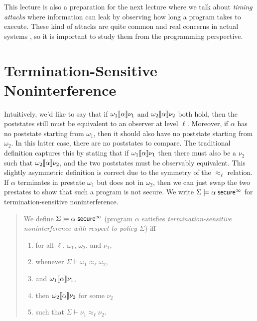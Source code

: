 \documentclass[11pt]{article}
\begin{document}
This lecture is also a preparation for the next lecture where we talk about
\emph{timing attacks} where information can leak by observing how long a program
takes to execute.  These kind of attacks are quite common and real concerns in
actual systems \citep{Brumley05cn}, so it is important to study them from the
programming perspective.

\section{Termination-Sensitive Noninterference}

Intuitively, we'd like to say that if $\omega_1 \llbracket \alpha \rrbracket \nu_1$ and
$\omega_2 \llbracket \alpha \rrbracket \nu_2$ both hold, then the poststates still must be
equivalent to an observer at level $\ell$.  Moreover, if $\alpha$ has no
poststate starting from $\omega_1$, then it should also have no poststate
starting from $\omega_2$.  In this latter case, there are no poststates
to compare.  The traditional definition \citep{Volpano97csfw} captures this by stating that
if $\omega_1 \llbracket \alpha \rrbracket \nu_1$ then there must also be a $\nu_2$ such
that $\omega_2 \llbracket \alpha \rrbracket \nu_2$, and the two poststates must be
observably equivalent.  This slightly asymmetric definition is correct due to
the symmetry of the $\approx_\ell$ relation.  If $\alpha$ terminates in prestate
$\omega_1$ but does not in $\omega_2$, then we can just swap the two prestates
to show that such a program is not secure.  We write
$\Sigma \models \alpha\; \mathsf{secure}^\infty$ for termination-sensitive
noninterference.

\begin{quote}
  We define $\Sigma \models \alpha\; \mathsf{secure}^\infty$ (program $\alpha$
  satisfies \emph{termination-sensitive noninterference with respect to policy
    $\Sigma$}) \newline iff
  \begin{enumerate}[]
  \item for all $\ell$, $\omega_1$, $\omega_2$, and $\nu_1$,
  \item whenever $\Sigma \vdash \omega_1 \approx_\ell \omega_2$,
  \item and $\omega_1 \llbracket \alpha \rrbracket \nu_1$,
  \item then $\omega_2 \llbracket \alpha \rrbracket \nu_2$ for some $\nu_2$
  \item such that $\Sigma \vdash \nu_1 \approx_\ell \nu_2$.
  \end{enumerate}
\end{quote}
\end{document}
